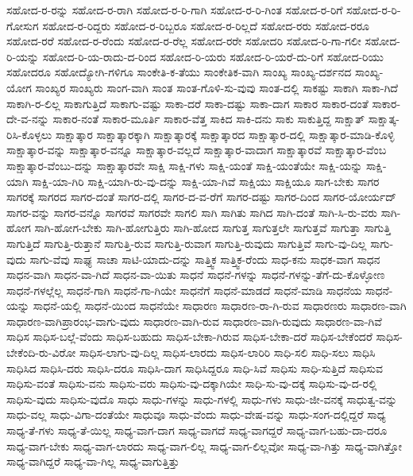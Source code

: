 {ಸಹೋದ-ರ-ರನ್ನು
ಸಹೋದ-ರ-ರಾಗಿ
ಸಹೋದ-ರ-ರಿ-ಗಾಗಿ
ಸಹೋದ-ರ-ರಿ-ಗಿಂತ
ಸಹೋದ-ರ-ರಿಗೆ
ಸಹೋದ-ರ-ರಿ-ಗೋಸುಗ
ಸಹೋದ-ರ-ರಿದ್ದರು
ಸಹೋದ-ರ-ರಿಬ್ಬರೂ
ಸಹೋದ-ರ-ರಿಲ್ಲದೆ
ಸಹೋದ-ರರು
ಸಹೋದ-ರರೂ
ಸಹೋದ-ರರೆ
ಸಹೋದ-ರ-ರೆಂದು
ಸಹೋದ-ರ-ರೆಲ್ಲ
ಸಹೋದ-ರರೇ
ಸಹೋದರಿ
ಸಹೋದ-ರಿ-ಗಾ-ಗಲೀ
ಸಹೋದ-ರಿ-ಯನ್ನು
ಸಹೋದ-ರಿ-ಯ-ರಾದು-ದ-ರಿಂದ
ಸಹೋದ-ರಿ-ಯರು
ಸಹೋದ-ರಿ-ಯರೆ-ದು-ರಿಗೆ
ಸಹೋದ-ರಿಯು
ಸಹೋದರೂ
ಸಹೋದ್ಯೋಗಿ-ಗಳಿಗೂ
ಸಾಂಕೇತಿ-ಕ-ತೆಯು
ಸಾಂಕೇತಿಕ-ವಾಗಿ
ಸಾಂಖ್ಯ
ಸಾಂಖ್ಯ-ದರ್ಶನದ
ಸಾಂಖ್ಯ-ಯೋಗ
ಸಾಂಖ್ಯರ
ಸಾಂಖ್ಯರು
ಸಾಂಗ-ವಾಗಿ
ಸಾಂತ
ಸಾಂತ-ಗೊಳಿ-ಸು-ವುವು
ಸಾಂತ-ದಲ್ಲಿ
ಸಾಕಷ್ಟು
ಸಾಕಾಗಿ
ಸಾಕಾ-ಗಿದೆ
ಸಾಕಾಗಿ-ರ-ಲಿಲ್ಲ
ಸಾಕಾಗುತ್ತಿದೆ
ಸಾಕಾಗು-ವಷ್ಟು
ಸಾಕಾ-ದರೆ
ಸಾಕಾ-ದಷ್ಟು
ಸಾಕಾ-ದಾಗ
ಸಾಕಾರ
ಸಾಕಾರ-ದಂತೆ
ಸಾಕಾರ-ದೇ-ವ-ನನ್ನು
ಸಾಕಾರ-ನಂತೆ
ಸಾಕಾರ-ಮೂರ್ತಿ
ಸಾಕಾರ-ವೆತ್ತ
ಸಾಕಿದ
ಸಾಕಿ-ದನು
ಸಾಕು
ಸಾಕುತ್ತಿದ್ದ
ಸಾಕ್ಷಾತ್
ಸಾಕ್ಷಾತ್ಕ-ರಿಸಿ-ಕೊಳ್ಳಲು
ಸಾಕ್ಷಾತ್ಕಾರ
ಸಾಕ್ಷಾತ್ಕಾರಕ್ಕಾಗಿ
ಸಾಕ್ಷಾತ್ಕಾರಕ್ಕೆ
ಸಾಕ್ಷಾತ್ಕಾರದ
ಸಾಕ್ಷಾತ್ಕಾರ-ದಲ್ಲಿ
ಸಾಕ್ಷಾತ್ಕಾರ-ಮಾಡಿ-ಕೊಳ್ಳಿ
ಸಾಕ್ಷಾತ್ಕಾರ-ವನ್ನು
ಸಾಕ್ಷಾತ್ಕಾರ-ವನ್ನೂ
ಸಾಕ್ಷಾತ್ಕಾರ-ವಲ್ಲದೆ
ಸಾಕ್ಷಾತ್ಕಾರ-ವಾದಾಗ
ಸಾಕ್ಷಾತ್ಕಾರವೆ
ಸಾಕ್ಷಾತ್ಕಾರ-ವೆಂಬ
ಸಾಕ್ಷಾತ್ಕಾರ-ವೆಂಬು-ದನ್ನು
ಸಾಕ್ಷಾತ್ಕಾರವೇ
ಸಾಕ್ಷಿ
ಸಾಕ್ಷಿ-ಗಳು
ಸಾಕ್ಷಿ-ಯಂತೆ
ಸಾಕ್ಷಿ-ಯಂತೆಯೇ
ಸಾಕ್ಷಿ-ಯನ್ನು
ಸಾಕ್ಷಿ-ಯಾಗಿ
ಸಾಕ್ಷಿ-ಯಾ-ಗಿರಿ
ಸಾಕ್ಷಿ-ಯಾಗಿ-ರು-ವು-ದನ್ನು
ಸಾಕ್ಷಿ-ಯಾ-ಗಿವೆ
ಸಾಕ್ಷಿಯು
ಸಾಕ್ಷಿಯೂ
ಸಾಗ-ಬೇಕು
ಸಾಗರ
ಸಾಗರಕ್ಕೆ
ಸಾಗರದ
ಸಾಗರ-ದಂತೆ
ಸಾಗರ-ದಲ್ಲಿ
ಸಾಗರ-ದ-ವ-ರೆಗೆ
ಸಾಗರ-ದಷ್ಟು
ಸಾಗರ-ದಿಂದ
ಸಾಗರ-ಯೋರ್ಯದ್
ಸಾಗರ-ವನ್ನು
ಸಾಗರ-ವನ್ನೊ
ಸಾಗರವೆ
ಸಾಗರವೇ
ಸಾಗಲಿ
ಸಾಗಿ
ಸಾಗಿತು
ಸಾಗಿದ
ಸಾಗಿ-ದಂತೆ
ಸಾಗಿ-ಸಿ-ರು-ವರು
ಸಾಗಿ-ಹೋಗ
ಸಾಗಿ-ಹೋಗ-ಬೇಕು
ಸಾಗಿ-ಹೋಗುತ್ತಿರು
ಸಾಗಿ-ಹೋದ
ಸಾಗುತ್ತ
ಸಾಗುತ್ತಲೇ
ಸಾಗುತ್ತವೆ
ಸಾಗುತ್ತಾ
ಸಾಗುತ್ತಿ
ಸಾಗುತ್ತಿದೆ
ಸಾಗುತ್ತಿ-ರುತ್ತಾನೆ
ಸಾಗುತ್ತಿ-ರುವ
ಸಾಗುತ್ತಿ-ರುವಾಗ
ಸಾಗುತ್ತಿ-ರುವುದು
ಸಾಗುತ್ತಿವೆ
ಸಾಗು-ವು-ದಿಲ್ಲ
ಸಾಗು-ವುದು
ಸಾಗು-ವೆವು
ಸಾಘ್ಯ
ಸಾಚಾ
ಸಾಟಿ-ಯಾದು-ದನ್ನು
ಸಾತ್ತ್ವಿಕ
ಸಾತ್ತ್ವಿಕ-ರೆಂದು
ಸಾಧ-ಕನು
ಸಾಧಕ-ವಾಗ
ಸಾಧನ
ಸಾಧನ-ವಾಗಿ
ಸಾಧನ-ವಾ-ಗಿದೆ
ಸಾಧನ-ವಾ-ಯಿತು
ಸಾಧನೆ
ಸಾಧನೆ-ಗಳನ್ನು
ಸಾಧನೆ-ಗಳನ್ನು-ತೆಗೆ-ದು-ಕೊಳ್ಳೋಣ
ಸಾಧನೆ-ಗಳಲ್ಲೆಲ್ಲ
ಸಾಧನೆ-ಗಾಗಿ
ಸಾಧನೆ-ಗಾ-ಗಿಯೇ
ಸಾಧನೆಗೆ
ಸಾಧನೆ-ಮಾಡದೆ
ಸಾಧನೆ-ಮಾಡಿ
ಸಾಧನೆಯ
ಸಾಧನೆ-ಯನ್ನು
ಸಾಧನೆ-ಯಲ್ಲಿ
ಸಾಧನೆ-ಯಿಂದ
ಸಾಧನೆಯೇ
ಸಾಧಾರಣ
ಸಾಧಾರಣ-ರಾ-ಗಿ-ರುವ
ಸಾಧಾರಣರು
ಸಾಧಾರಣ-ವಾಗಿ
ಸಾಧಾರಣ-ವಾಗಿಪ್ರಾರಂಭ-ವಾಗು-ವುದು
ಸಾಧಾರಣ-ವಾಗಿ-ರುವ
ಸಾಧಾರಣ-ವಾಗಿ-ರುವುದು
ಸಾಧಾರಣ-ವಾ-ಗಿವೆ
ಸಾಧಿಸ
ಸಾಧಿಸ-ಬಲ್ಲೆ-ವೆಂದು
ಸಾಧಿಸ-ಬಹುದು
ಸಾಧಿಸ-ಬೇಕಾ-ಗಿರುವ
ಸಾಧಿಸ-ಬೇಕಾ-ದರೆ
ಸಾಧಿಸ-ಬೇಕೆಂದರೆ
ಸಾಧಿಸ-ಬೇಕೆಂದಿ-ರು-ವಿರೋ
ಸಾಧಿಸ-ಲಾಗು-ವು-ದಿಲ್ಲ
ಸಾಧಿಸ-ಲಾರದು
ಸಾಧಿಸ-ಲಾರಿರಿ
ಸಾಧಿ-ಸಲಿ
ಸಾಧಿ-ಸಲು
ಸಾಧಿಸಿ
ಸಾಧಿಸಿದ
ಸಾಧಿಸಿ-ದರು
ಸಾಧಿಸಿ-ದರೂ
ಸಾಧಿಸಿ-ದಾಗ
ಸಾಧಿಸಿದ್ದರೂ
ಸಾಧಿ-ಸಿವೆ
ಸಾಧಿಸು
ಸಾಧಿ-ಸುತ್ತಿದೆ
ಸಾಧಿಸುವ
ಸಾಧಿಸು-ವಂತೆ
ಸಾಧಿಸು-ವನು
ಸಾಧಿಸು-ವರು
ಸಾಧಿಸು-ವು-ದಕ್ಕಾಗಿಯೇ
ಸಾಧಿ-ಸು-ವು-ದಕ್ಕೆ
ಸಾಧಿಸು-ವು-ದ-ರಲ್ಲಿ
ಸಾಧಿಸು-ವುದು
ಸಾಧಿಸು-ವುದೊ
ಸಾಧು
ಸಾಧು-ಗಳನ್ನು
ಸಾಧು-ಗಳಲ್ಲಿ
ಸಾಧು-ಗಳು
ಸಾಧು-ಜೀ-ವನಕ್ಕೆ
ಸಾಧುತ್ವ-ವನ್ನು
ಸಾಧು-ವಲ್ಲ
ಸಾಧು-ವಿಗಾ-ದಂತೆಯೇ
ಸಾಧುವೂ
ಸಾಧು-ವೆಂದು
ಸಾಧು-ವೇಷ-ವನ್ನು
ಸಾಧು-ಸಂಗ-ದಲ್ಲಿದ್ದರೆ
ಸಾಧ್ಯ
ಸಾಧ್ಯ-ತೆ-ಗಳು
ಸಾಧ್ಯ-ತೆ-ಯಿಲ್ಲ
ಸಾಧ್ಯ-ವಾಗ-ದಾಗ
ಸಾಧ್ಯ-ವಾಗದೆ
ಸಾಧ್ಯ-ವಾಗದ್ದರೆ
ಸಾಧ್ಯ-ವಾಗ-ಬಹು-ದಾ-ದರೂ
ಸಾಧ್ಯ-ವಾಗ-ಬೇಕು
ಸಾಧ್ಯ-ವಾಗ-ಲಾರದು
ಸಾಧ್ಯ-ವಾಗ-ಲಿಲ್ಲ
ಸಾಧ್ಯ-ವಾಗ-ಲಿಲ್ಲವೋ
ಸಾಧ್ಯ-ವಾ-ಗಿತ್ತು
ಸಾಧ್ಯ-ವಾಗಿತ್ತೋ
ಸಾಧ್ಯ-ವಾಗಿದ್ದರೆ
ಸಾಧ್ಯ-ವಾ-ಗಿಲ್ಲ
ಸಾಧ್ಯ-ವಾಗುತ್ತಿತ್ತು
}
